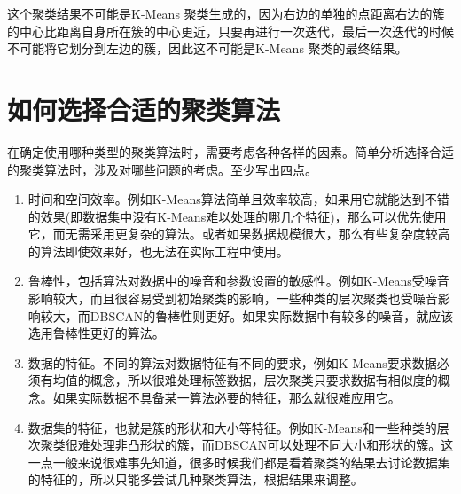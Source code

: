 \documentclass[12pt, UTF8]{article}
\begin{document}
这个聚类结果不可能是K-Means 聚类生成的，因为右边的单独的点距离右边的簇的中心比距离自身所在簇的中心更近，只要再进行一次迭代，最后一次迭代的时候不可能将它划分到左边的簇，因此这不可能是K-Means 聚类的最终结果。

\section{如何选择合适的聚类算法}

在确定使用哪种类型的聚类算法时，需要考虑各种各样的因素。简单分析选择合适的聚类算法时，涉及对哪些问题的考虑。至少写出四点。

\begin{enumerate}
  \item 时间和空间效率。例如K-Means算法简单且效率较高，如果用它就能达到不错的效果(即数据集中没有K-Means难以处理的哪几个特征)，那么可以优先使用它，而无需采用更复杂的算法。或者如果数据规模很大，那么有些复杂度较高的算法即使效果好，也无法在实际工程中使用。
  \item 鲁棒性，包括算法对数据中的噪音和参数设置的敏感性。例如K-Means受噪音影响较大，而且很容易受到初始聚类的影响，一些种类的层次聚类也受噪音影响较大，而DBSCAN的鲁棒性则更好。如果实际数据中有较多的噪音，就应该选用鲁棒性更好的算法。
  \item 数据的特征。不同的算法对数据特征有不同的要求，例如K-Means要求数据必须有均值的概念，所以很难处理标签数据，层次聚类只要求数据有相似度的概念。如果实际数据不具备某一算法必要的特征，那么就很难应用它。
  \item 数据集的特征，也就是簇的形状和大小等特征。例如K-Means和一些种类的层次聚类很难处理非凸形状的簇，而DBSCAN可以处理不同大小和形状的簇。这一点一般来说很难事先知道，很多时候我们都是看着聚类的结果去讨论数据集的特征的，所以只能多尝试几种聚类算法，根据结果来调整。
\end{enumerate}
\end{document}
